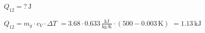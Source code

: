 \( Q_{12} = ? \, \text{J} \)  

\( Q_{12} = m_g \cdot c_V \cdot \Delta T \)  
\( = 3.68 \cdot 0.633 \, \frac{\text{kJ}}{\text{kg·K}} \cdot (500 - 0.003 \, \text{K}) \)  
\( = 1.13 \, \text{kJ} \)